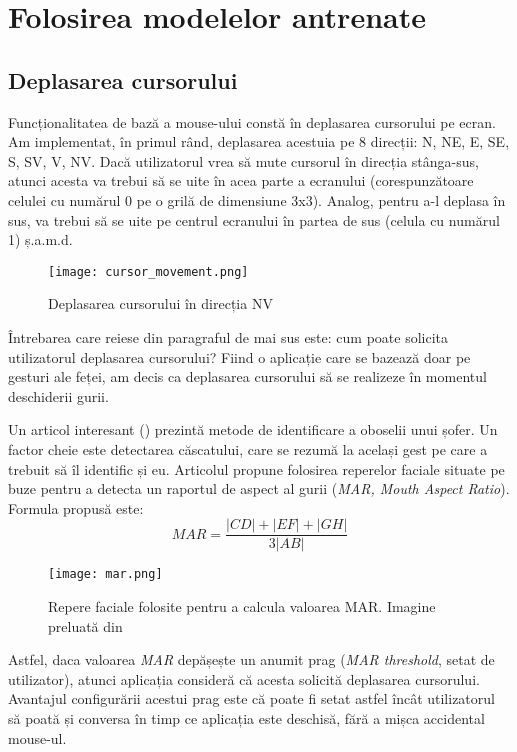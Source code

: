 \chapter{Folosirea modelelor antrenate}
\label{chapter5}
\section{Deplasarea cursorului}
Funcționalitatea de bază a mouse-ului constă în deplasarea cursorului pe ecran.
Am implementat, în primul rând, deplasarea acestuia pe 8 direcții: N, NE, E, SE, S, SV, V, NV.
Dacă utilizatorul vrea să mute cursorul în direcția stânga-sus, atunci acesta va trebui să se uite în acea parte a ecranului (corespunzătoare celulei cu numărul 0 pe o grilă de dimensiune 3x3).
Analog, pentru a-l deplasa în sus, va trebui să se uite pe centrul ecranului în partea de sus (celula cu numărul 1) ș.a.m.d.

\begin{figure}[H]
    \centering
    \texttt{[image: cursor\_movement.png]}
    \caption{Deplasarea cursorului în direcția NV}
\end{figure}

Întrebarea care reiese din paragraful de mai sus este: cum poate solicita utilizatorul deplasarea cursorului?
Fiind o aplicație care se bazează doar pe gesturi ale feței, am decis ca deplasarea cursorului să se realizeze în momentul deschiderii gurii.

Un articol interesant (\cite{driver_drowsiness}) prezintă metode de identificare a oboselii unui șofer.
Un factor cheie este detectarea căscatului, care se rezumă la același gest pe care a trebuit să îl identific și eu.
Articolul propune folosirea reperelor faciale situate pe buze pentru a detecta un raportul de aspect al gurii (\emph{MAR, Mouth Aspect Ratio}).
Formula propusă este:
$$MAR = \frac{|CD| + |EF| + |GH|}{3|AB|}$$

\begin{figure}[H]
    \centering
    \texttt{[image: mar.png]}
    \caption{Repere faciale folosite pentru a calcula valoarea MAR. Imagine preluată din \cite{driver_drowsiness}}
\end{figure}

Astfel, daca valoarea \emph{MAR} depășește un anumit prag (\emph{MAR threshold}, setat de utilizator), atunci aplicația consideră că acesta solicită deplasarea cursorului.
Avantajul configurării acestui prag este că poate fi setat astfel încât utilizatorul să poată și conversa în timp ce aplicația este deschisă, fără a mișca accidental mouse-ul.

